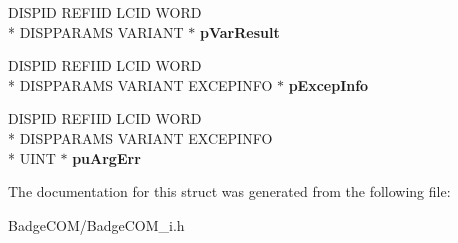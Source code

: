 \begin{DoxyCompactItemize}
\item 
\hypertarget{struct_i_badge_icon_selective_vtbl_aa7218e1942ec27d3a646707cacb1fcfb}{D\-I\-S\-P\-I\-D R\-E\-F\-I\-I\-D L\-C\-I\-D W\-O\-R\-D \\*
D\-I\-S\-P\-P\-A\-R\-A\-M\-S V\-A\-R\-I\-A\-N\-T $\ast$ {\bfseries p\-Var\-Result}}\label{struct_i_badge_icon_selective_vtbl_aa7218e1942ec27d3a646707cacb1fcfb}

\item 
\hypertarget{struct_i_badge_icon_selective_vtbl_a3dff99138270e5fc4c1f8e2ba305a578}{D\-I\-S\-P\-I\-D R\-E\-F\-I\-I\-D L\-C\-I\-D W\-O\-R\-D \\*
D\-I\-S\-P\-P\-A\-R\-A\-M\-S V\-A\-R\-I\-A\-N\-T E\-X\-C\-E\-P\-I\-N\-F\-O $\ast$ {\bfseries p\-Excep\-Info}}\label{struct_i_badge_icon_selective_vtbl_a3dff99138270e5fc4c1f8e2ba305a578}

\item 
\hypertarget{struct_i_badge_icon_selective_vtbl_a07b1005981836d59867a3d79889bf2ed}{D\-I\-S\-P\-I\-D R\-E\-F\-I\-I\-D L\-C\-I\-D W\-O\-R\-D \\*
D\-I\-S\-P\-P\-A\-R\-A\-M\-S V\-A\-R\-I\-A\-N\-T E\-X\-C\-E\-P\-I\-N\-F\-O \\*
U\-I\-N\-T $\ast$ {\bfseries pu\-Arg\-Err}}\label{struct_i_badge_icon_selective_vtbl_a07b1005981836d59867a3d79889bf2ed}

\end{DoxyCompactItemize}


The documentation for this struct was generated from the following file\-:\begin{DoxyCompactItemize}
\item 
Badge\-C\-O\-M/Badge\-C\-O\-M\-\_\-i.\-h\end{DoxyCompactItemize}
